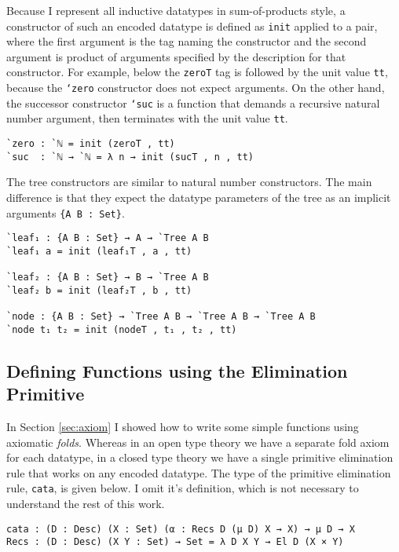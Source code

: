 \documentclass[runningheads,a4paper]{llncs}
\newcommand{\refsec}[1]{Section \ref{sec:#1}}
\begin{document}
Because I represent all inductive datatypes in sum-of-products style,
a constructor of such an encoded datatype is defined as
{\tt init} applied to a pair, where the first argument is the tag
naming the constructor and the second argument is product of arguments
specified by the description for that constructor. For example, below
the {\tt zeroT} tag is followed by the
unit value {\tt tt}, because the {\tt `zero} constructor does not
expect arguments. On the other hand, the successor constructor
{\tt `suc} is a function that demands a recursive natural number
argument, then terminates with the unit value {\tt tt}.

\begin{verbatim}
`zero : `ℕ = init (zeroT , tt)
`suc  : `ℕ → `ℕ = λ n → init (sucT , n , tt)
\end{verbatim}

The tree constructors are similar to
natural number constructors. The main difference is that they expect
the datatype parameters of the tree as an implicit arguments
{\tt \{A B : Set\}}.

\begin{verbatim}
`leaf₁ : {A B : Set} → A → `Tree A B
`leaf₁ a = init (leaf₁T , a , tt)

`leaf₂ : {A B : Set} → B → `Tree A B
`leaf₂ b = init (leaf₂T , b , tt)

`node : {A B : Set} → `Tree A B → `Tree A B → `Tree A B
`node t₁ t₂ = init (nodeT , t₁ , t₂ , tt)
\end{verbatim}

\subsection{Defining Functions using the Elimination Primitive}

In \refsec{axiom} I showed how to write some simple functions
using axiomatic {\it folds}. Whereas in an open type theory we have a
separate fold axiom for each datatype, in a closed type theory we have
a single primitive elimination rule that works on any encoded
datatype. The type of the primitive elimination rule, {\tt cata}, is
given below. I omit it's definition, which is not necessary to
understand the rest of this work.

\begin{verbatim}
cata : (D : Desc) (X : Set) (α : Recs D (μ D) X → X) → μ D → X
Recs : (D : Desc) (X Y : Set) → Set = λ D X Y → El D (X × Y)
\end{verbatim}
\end{document}
